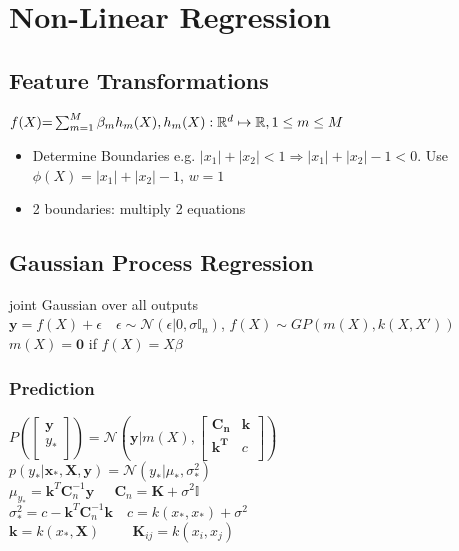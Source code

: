 \section{Non-Linear Regression}
\subsection{Feature Transformations}
$
		f(X) \text{=} \sum_{m\text{=}1}^M \beta_mh_m(X), 
		h_m(X) : \mathbb R^d\mapsto \mathbb R, 1\leq m \leq M
$
\begin{itemize}
  \item Determine Boundaries e.g. $|x_1| + |x_2| < 1 \Rightarrow |x_1| + |x_2| - 1 < 0$. Use $\phi(X) = |x_1| + |x_2| - 1$, $w =1$
  \item 2 boundaries: multiply 2 equations
 \end{itemize}

\subsection{Gaussian Process Regression}
joint Gaussian over all outputs\\
$\mathbf{y}=f(X)+\epsilon \quad \epsilon\sim \mathcal{N}(\epsilon|0,\sigma\mathbb{I}_n)$, $f(X) \sim GP(m(X), k(X,X'))$\\

$m(X) = \mathbf 0$ if $f(X)=X\beta$
\subsubsection*{Prediction}

$P(\begin{bmatrix}
\mathbf{y}\\
y_*\\
\end{bmatrix}){=}\mathcal{N}(\mathbf{y}|m(X),\begin{bmatrix}
\mathbf{C_n} & \mathbf{k} \\
\mathbf{k^T} & c \\
\end{bmatrix})$\\
\vspace{0.5em}
$p(y_*|\mathbf{x_*}, \mathbf{X}, \mathbf{y}){=} \mathcal{N}(y_*|\mu_{*}, \sigma^2_{*})$\\
$\mu_{y_*} = \mathbf{k}^T\mathbf{C}_n^{-1}\mathbf{y}\quad\ \  \mathbf{C}_n=\mathbf{K}+\sigma^2\mathbb{I}$\\
$\sigma^2_{*}{=}c{-}\mathbf{k}^T\mathbf{C}_n^{-1}\mathbf{k}\quad c{=}k(x_*,x_*){+}\sigma^2$\\
$\mathbf{k}=k(x_*,\mathbf{X})\quad\ \ \ \ \ \ \mathbf{K}_{ij}=k(x_i,x_j)$\\




